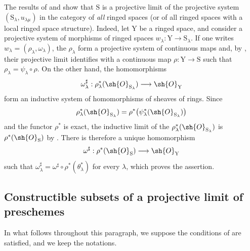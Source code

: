 \begin{remark}[8.2.14]
\label{IV.8.2.14}
The results of  and  show that $\mathrm{S}$ is a projective limit of the projective system $(\mathrm{S}_\lambda,u_{\lambda\mu})$ in the category of \emph{all} ringed spaces (or of all ringed spaces with a local ringed space structure).
Indeed, let $\mathrm{Y}$ be a ringed space, and consider a projective system of morphisms of ringed spaces $w_\lambda:\mathrm{Y}\to\mathrm{S}_\lambda$.
If one writes $w_\lambda=(\rho_\lambda,\omega_\lambda)$, the $\rho_\lambda$ form a projective system of continuous maps and, by , their projective limit identifies with a continuous map $\rho:\mathrm{Y}\to\mathrm{S}$ such that $\rho_\lambda=\psi_\lambda\circ\rho$. On the other hand, the homomorphisms
\[
 \omega_\lambda^\sharp:\rho_\lambda^*(\sh{O}_{\mathrm{S}_\lambda})\longrightarrow\sh{O}_\mathrm{Y}
\]
form an inductive system of homomorphisms of sheaves of rings. Since
\[
 \rho_\lambda^*(\sh{O}_{\mathrm{S}_\lambda})
 =\rho^*\bigl(\psi_\lambda^*(\sh{O}_{\mathrm{S}_\lambda})\bigr)
\]
and the functor $\rho^*$ is exact, the inductive limit of the $\rho_\lambda^*(\sh{O}_{\mathrm{S}_\lambda})$ is $\rho^*(\sh{O}_\mathrm{S})$ by . There is therefore a unique homomorphism
\[
 \omega^\sharp:\rho^*(\sh{O}_\mathrm{S})\longrightarrow\sh{O}_\mathrm{Y}
\]
such that $\omega_\lambda^\sharp=\omega^\sharp\circ\rho^*(\theta_\lambda^*)$ for every $\lambda$, which proves the assertion.
\end{remark}

\subsection{Constructible subsets of a projective limit of preschemes}
\label{subsection:IV.8.3}

\begin{env}[8.3.1]
\label{IV.8.3.1}
In what follows throughout this paragraph, we suppose the conditions of  are satisfied, and we keep the notations.
\end{env}

